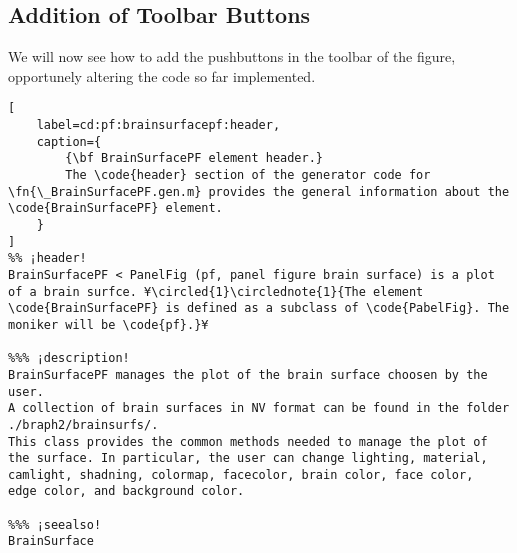 \documentclass{tufte-handout}
\begin{document}
\subsection{Addition of Toolbar Buttons}

We will now see how to add the pushbuttons in the toolbar of the figure, opportunely altering the code so far implemented.

\begin{lstlisting}[
	label=cd:pf:brainsurfacepf:header,
	caption={
		{\bf BrainSurfacePF element header.}
		The \code{header} section of the generator code for \fn{\_BrainSurfacePF.gen.m} provides the general information about the \code{BrainSurfacePF} element.
	}
]
%% ¡header!
BrainSurfacePF < PanelFig (pf, panel figure brain surface) is a plot of a brain surfce. ¥\circled{1}\circlednote{1}{The element \code{BrainSurfacePF} is defined as a subclass of \code{PabelFig}. The moniker will be \code{pf}.}¥

%%% ¡description!
BrainSurfacePF manages the plot of the brain surface choosen by the user. 
A collection of brain surfaces in NV format can be found in the folder 
./braph2/brainsurfs/.
This class provides the common methods needed to manage the plot of 
the surface. In particular, the user can change lighting, material, 
camlight, shadning, colormap, facecolor, brain color, face color, 
edge color, and background color. 

%%% ¡seealso!
BrainSurface
\end{lstlisting}
\end{document}

